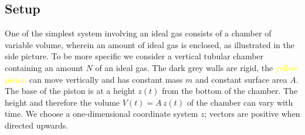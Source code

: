\documentclass[a4paper,12pt,%
onecolumn,oneside,titlepage,%
british%
]{memoir}
\renewcommand*{\|}[1][]{\nonscript\:#1\vert\nonscript\:\mathopen{}}
\newcommand*{\yN}{N}
\newcommand*{\yM}{m}%
\begin{document}
\subsection{Setup}
\label{sec:idealgas_ex_setup}

One of the simplest system involving an ideal gas consists of a chamber of variable volume, wherein an amount of ideal gas is enclosed, as illustrated in the side picture.
To be more specific we consider a vertical tubular chamber containing an amount $\yN$ of an ideal gas. The \textcolor{midgrey}{dark grey walls} are rigid, the \textcolor{yellow}{yellow piston} can move vertically and has constant mass $\yM$ and constant surface area $A$.
%
%
The base of the piston is at a height $z(t)$ from the bottom of the chamber. The height and therefore the volume $V(t) = A\,z(t)$ of the chamber can vary with time. We choose a one-dimensional coordinate system $z$; vectors are positive when directed upwards.
\end{document}
